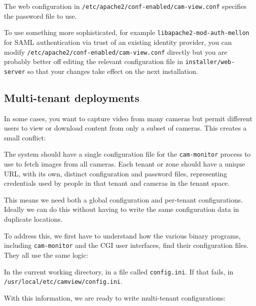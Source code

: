     The web configuration in
    \texttt{/etc/apache2/conf-enabled/cam-view.conf} specifies the
    password file to use.

    To use something more sophisticated, for example
    \texttt{libapache2-mod-auth-mellon} for SAML authentication
    via trust of an existing identity provider, you can modify
    \texttt{/etc/apache2/conf-enabled/cam-view.conf} directly but you
    are probably better off editing the relevant configuration file in
    \texttt{installer/web-server} so that your changes take effect on
    the next installation.

  \subsection{Multi-tenant deployments}

    In some cases, you want to capture video from many cameras but
    permit different users to view or download content from only a subset
    of cameras.  This creates a small conflict:

    \BE
    \I The system should have a single configuration file for the
       \texttt{cam-monitor} process to use to fetch images from all cameras.
    \I Each tenant or zone should have a unique URL, with its own,
       distinct configuration and password files, representing credentials
       used by people in that tenant and cameras in the tenant space.
    \EE

    This means we need both a global configuration and per-tenant
    configurations.  Ideally we can do this without having to write the
    same configuration data in duplicate locations.

    To address this, we first have to understand how the various
    \PRODUCT{} binary programs, including \texttt{cam-monitor} and
    the CGI user interfaces, find their configuration files.  They
    all use the same logic:

    \BE
    \I In the current working directory, in a file called \texttt{config.ini}.
    \I If that fails, in \texttt{/usr/local/etc/camview/config.ini}.
    \EE

    With this information, we are ready to write multi-tenant configurations:

